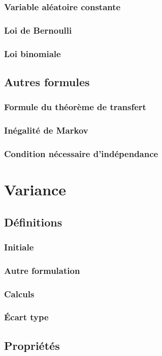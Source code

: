 \documentclass[12pt,a4paper,french]{book}
\begin{document}
			\subsubsection{Variable aléatoire constante}
			\subsubsection{Loi de Bernoulli}
			\subsubsection{Loi binomiale}
		\subsection{Autres formules}
			\subsubsection{Formule du théorème de transfert}
			\subsubsection{Inégalité de Markov}
			\subsubsection{Condition nécessaire d'indépendance}
	\section{Variance}
		\subsection{Définitions}
			\subsubsection{Initiale}
			\subsubsection{Autre formulation}
			\subsubsection{Calculs}
			\subsubsection{Écart type}
		\subsection{Propriétés}
\end{document}
